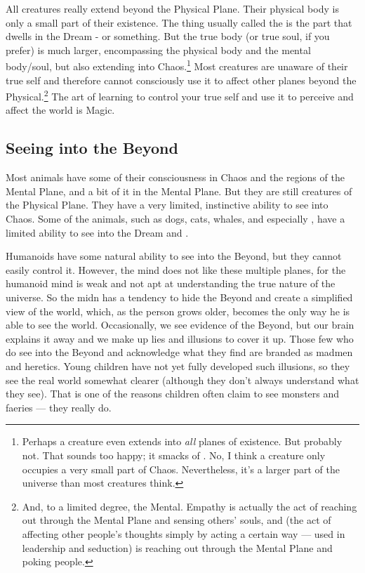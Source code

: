All creatures really extend beyond the Physical Plane. Their physical body is only a small part of their existence. The thing usually called the  is the part that dwells in the Dream - or something. But the true body (or true soul, if you prefer) is much larger, encompassing the physical body and the mental body/soul, but also extending into Chaos.\footnote{Perhaps a creature even extends into \emph{all} planes of existence. But probably not. That sounds too happy; it smacks of . No, I think a creature only occupies a very small part of Chaos. Nevertheless, it's a larger part of the universe than most creatures think.} Most creatures are unaware of their true self and therefore cannot consciously use it to affect other planes beyond the Physical.\footnote{And, to a limited degree, the Mental. Empathy is actually the act of reaching out through the Mental Plane and sensing others' souls, and  (the act of affecting other people's thoughts simply by acting a certain way --- used in leadership and seduction) is reaching out through the Mental Plane and poking people.} The art of learning to control your true self and use it to perceive and affect the world is Magic. 

\subsection{Seeing into the Beyond}
Most animals have some of their consciousness in Chaos and the  regions of the Mental Plane, and a bit of it in the  Mental Plane. 
But they are still creatures of the Physical Plane. They have a very limited, instinctive ability to see into Chaos. Some of the  animals, such as dogs, cats, whales, \cortios{} and especially \nycans{}, have a limited ability to see into the Dream and \Nyx{}. 

Humanoids have some natural ability to see into the Beyond, but they cannot easily control it. However, the mind does not like these multiple planes, for the humanoid mind is weak and not apt at understanding the true nature of the universe. So the midn has a tendency to hide the Beyond and create a simplified view of the world, which, as the person grows older, becomes the only way he is able to see the world. Occasionally, we see evidence of the Beyond, but our brain explains it away and we make up lies and illusions to cover it up. 
Those few who do see into the Beyond and acknowledge what they find are branded as madmen and heretics. 
Young children have not yet fully developed such illusions, so they see the real world somewhat clearer (although they don't always understand what they see). That is one of the reasons children often claim to see monsters and faeries --- they really do. 

